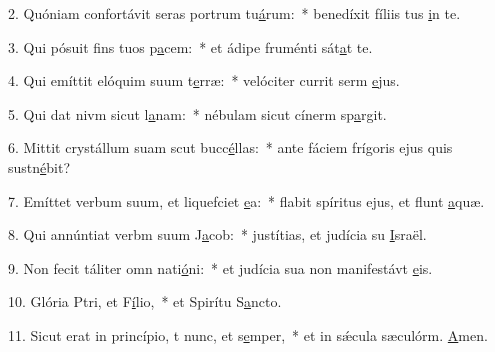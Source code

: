 2. Quóniam confortávit seras portrum tu\uline{á}rum:~* benedíxit fíliis tus \uline{i}n te.\par 
3. Qui pósuit fins tuos p\uline{a}cem:~* et ádipe fruménti sát\uline{a}t te.\par 
4. Qui emíttit elóquim suum t\uline{e}rræ:~* velóciter currit serm \uline{e}jus.\par 
5. Qui dat nivm sicut l\uline{a}nam:~* nébulam sicut cínerm sp\uline{a}rgit.\par 
6. Mittit crystállum suam scut bucc\uline{é}llas:~* ante fáciem frígoris ejus quis sustn\uline{é}bit?\par 
7. Emíttet verbum suum, et liquefciet \uline{e}a:~* flabit spíritus ejus, et flunt \uline{a}quæ.\par 
8. Qui annúntiat verbm suum J\uline{a}cob:~* justítias, et judícia su \uline{I}sraël.\par 
9. Non fecit táliter omn nati\uline{ó}ni:~* et judícia sua non manifestávt \uline{e}is.\par 
10. Glória Ptri, et F\uline{í}lio,~* et Spirítu S\uline{a}ncto.\par 
11. Sicut erat in princípio, t nunc, et s\uline{e}mper,~* et in sǽcula sæculórm. \uline{A}men.\par 
